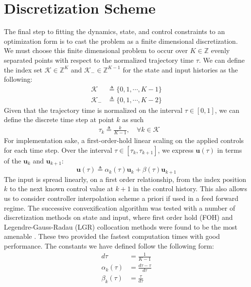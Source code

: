 \section{Discretization Scheme}
The final step to fitting the dynamics, state, and control constraints to an optimization form is to cast the problem as a finite dimensional discretization. We must choose this finite dimensional problem to occur over $K\in\mathbb{Z}$ evenly separated points with respect to the normalized trajectory time $\tau$. We can define the index set $\mathcal{K}\in\mathbb{Z}^{K}$ and $\mathcal{K}_-\in\mathbb{Z}^{K-1}$ for the state and input histories as the following:
\begin{align*}
	\mathcal{K} &\triangleq \{0,1,\cdots, K-1\} \\
	\mathcal{K}_- &\triangleq \{0,1,\cdots, K-2 \}
\end{align*}
%
Given that the trajectory time is normalized on the interval $\tau \in [0,1 ]$, we can define the discrete time step at point $k$ as such
%
\begin{align}
& \tau_k \triangleq \frac{k}{K-1}, \quad \forall k \in \mathcal{K}
\end{align}
%
For implementation sake, a first-order-hold linear scaling on the applied controls for each time step. Over the interval $\tau \in [\tau_k, \tau_{k+1}]$, we express $\mathbf{u}(\tau)$ in terms of the $\mathbf{u}_k$
 and $\mathbf{u}_{k+1}$:
\begin{equation}
	\mathbf{u}(\tau) \triangleq \alpha_k(\tau) \mathbf{u}_k + \beta(\tau) \mathbf{u}_{k+1}
\end{equation}
%
The input is spread linearly, on a first order relationship, from the index position $k$ to the next known control value at $k+1$ in the control history. This also allows us to consider controller interpolation scheme a priori if used in a feed forward regime. The successive convexification algorithm was tested with a number of discretization methods on state and input, where first order hold (FOH) and Legendre-Gauss-Radau (LGR) collocation methods were found to be the most amenable \cite{malyuta2019discrete}. These two provided the fastest computation times with good performance.
%
The constants we have defined follow the following form:
\begin{align}
d\tau &= \frac{1}{K-1} \\
\alpha_k(\tau) &= \frac{d\tau - \tau}{d\tau} \\
\beta_k(\tau) &= \frac{\tau}{d\tau}
\end{align}
%

